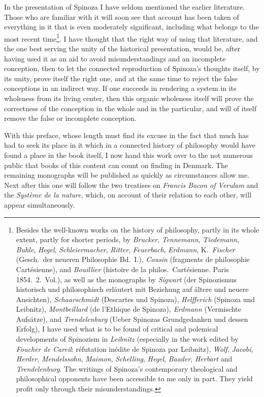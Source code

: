 \documentclass[12pt,a4paper,openany]{book}
\newcommand{\opage}[1]{\marginnote{\footnotesize\textit{[#1]}}}
\begin{document}
In the presentation of Spinoza I have seldom mentioned the earlier
literature. Those who are familiar with it will soon see that account
has been taken of everything in it that is even moderately significant,
including what belongs to the most recent time\footnote{Besides the
well-known works on the history of philosophy, partly in its whole
extent, partly for shorter periods, by \emph{Brucker}, \emph{Tennemann},
\emph{Tiedemann}, \emph{Buhle}, \emph{Hegel}, \emph{Schleiermacher},
\emph{Ritter}, \emph{Feuerbach}, \emph{Erdmann}, K.\ \emph{Fischer}
(Gesch.\ der neueren Philosophie Bd.\ I.), \emph{Cousin} (fragments de
philosophie Cartésienne), and \emph{Bouillier} (histoire de la philos.\
Cartésienne. Paris 1854.\ 2.\ Vol.), as well as the monographs by
\emph{Sigwart} (der Spinozismus historisch und philosophisch erläutert
mit Beziehung auf ältere und neuere Ansichten), \emph{Schaarschmidt}
(Descartes und Spinoza), \emph{Helfferich} (Spinoza und Leibnitz),
\emph{Montbeillard} (de l'Ethique de Spinoza), \emph{Erdmann}
(Vermischte Aufsätze), and \emph{Trendelenburg} (Ueber Spinozas
Grundgedanken und dessen Erfolg), I have used what is to be found of
critical and polemical developments of Spinozism in \emph{Leibnitz}
(especially in the work edited by \emph{Foucher de Careil}: réfutation
inédite de Spinoza par Leibnitz), \emph{Wolf}, \emph{Jacobi},
\emph{Herder}, \emph{Mendelssohn}, \emph{Maimon}, \emph{Schelling},
\emph{Hegel}, \emph{Baader}, \emph{Herbart} and \emph{Trendelenburg}.
The writings of Spinoza's contemporary theological and philosophical
opponents have been accessible to me only in part. They yield profit
only through their misunderstandings.}. I have thought that the right
way of using that literature, and the one best serving the unity of the
historical presentation, would be, after having used it as an aid to
\opage{14}avoid misunderstandings and an incomplete conception, then to
let the connected reproduction of Spinoza's thoughts itself, by its
unity, prove itself the right one, and at the same time to reject the
false conceptions in an indirect way. If one succeeds in rendering a
system in its wholeness from its living center, then this organic
wholeness itself will prove the correctness of the conception in the
whole and in the particular, and will of itself remove the false or
incomplete conception.

With this preface, whose length must find its excuse in the fact that
much has had to seek its place in it which in a connected history of
philosophy would have found a place in the book itself, I now hand this
work over to the not numerous public that books of this content can
count on finding in Denmark. The remaining monographs will be published
as quickly as circumstances allow me. Next after this one will follow
the two treatises on \emph{Francis Bacon of Verulam} and the
\emph{Système de la nature}, which, on account of their relation to each
other, will appear simultaneously.
\end{document}
